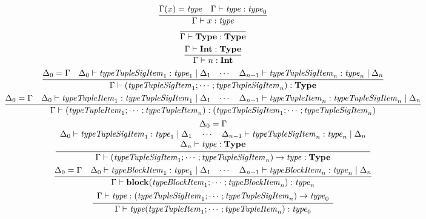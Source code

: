 \begin{gather*}
  \infer{\Gamma \vdash x: \mathit{type}}{
    \Gamma(x) = \mathit{type}
    &
    \Gamma \vdash \mathit{type}: \mathit{type}_0
  }
  \\
  \infer{\Gamma \vdash \mathbf{Type}: \mathbf{Type}}{}
  \\
  \infer{\Gamma \vdash n: \mathbf{Int}}{
    \Gamma \vdash \mathbf{Int}: \mathbf{Type}
  }
  \\
  \infer{\Gamma \vdash (\mathit{typeTupleSigItem}_1; \cdots; \mathit{typeTupleSigItem}_n): \mathbf{Type}}{
    \Delta_0 = \Gamma
    &
    \Delta_0 \vdash \mathit{typeTupleSigItem}_1: \mathit{type}_1 \mid \Delta_1
    &
    \cdots
    &
    \Delta_{n - 1} \vdash \mathit{typeTupleSigItem}_n: \mathit{type}_n \mid \Delta_n
  }
  \\
  \infer{\Gamma \vdash (\mathit{typeTupleItem}_1; \cdots; \mathit{typeTupleItem}_n): (\mathit{typeTupleSigItem}_1; \cdots; \mathit{typeTupleSigItem}_n)}{
    \Delta_0 = \Gamma
    &
    \Delta_0 \vdash \mathit{typeTupleItem}_1: \mathit{typeTupleSigItem}_1 \mid \Delta_1
    &
    \cdots
    &
    \Delta_{n - 1} \vdash \mathit{typeTupleItem}_n: \mathit{typeTupleSigItem}_n \mid \Delta_n
  }
  \\
  \infer{\Gamma \vdash (\mathit{typeTupleSigItem}_1; \cdots; \mathit{typeTupleSigItem}_n) \rightarrow \mathit{type}: \mathbf{Type}}{
    \begin{array}{c}
      \Delta_0 = \Gamma
      \\
      \Delta_0 \vdash \mathit{typeTupleSigItem}_1: \mathit{type}_1 \mid \Delta_1
      \hspace{1em}
      \cdots
      \hspace{1em}
      \Delta_{n - 1} \vdash \mathit{typeTupleSigItem}_n: \mathit{type}_n \mid \Delta_n
      \\
      \Delta_n \vdash \mathit{type}: \mathbf{Type}
    \end{array}
  }
  \\
  \infer{\Gamma \vdash \mathbf{block}(\mathit{typeBlockItem}_1; \cdots; \mathit{typeBlockItem}_n): \mathit{type}_n}{
    \Delta_0 = \Gamma
    &
    \Delta_0 \vdash \mathit{typeBlockItem}_1: \mathit{type}_1 \mid \Delta_1
    &
    \cdots
    &
    \Delta_{n - 1} \vdash \mathit{typeBlockItem}_n: \mathit{type}_n \mid \Delta_n
  }
  \\
  \infer{\Gamma \vdash \mathit{type}(\mathit{typeTupleItem}_1; \cdots; \mathit{typeTupleItem}_n): \mathit{type}_0}{
    \begin{array}{c}
      \Gamma \vdash \mathit{type}: (\mathit{typeTupleSigItem}_1; \cdots; \mathit{typeTupleSigItem}_n) \rightarrow \mathit{type}_0

\end{array}}
\end{gather*}
